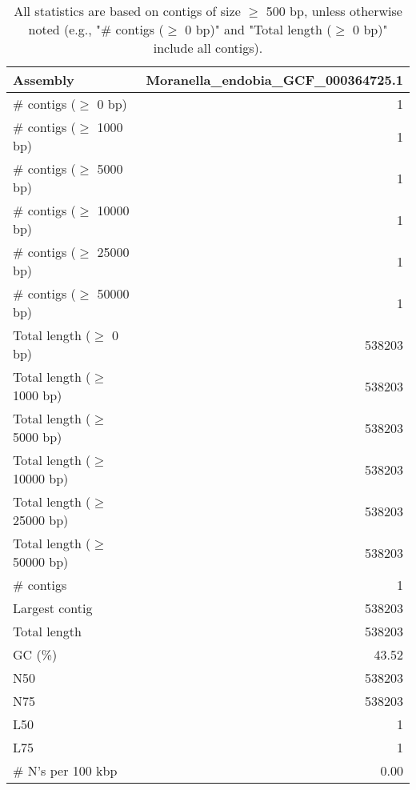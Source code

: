 \documentclass[12pt,a4paper]{article}
\begin{document}
\begin{table}[ht]
\begin{center}
\caption{All statistics are based on contigs of size $\geq$ 500 bp, unless otherwise noted (e.g., "\# contigs ($\geq$ 0 bp)" and "Total length ($\geq$ 0 bp)" include all contigs).}
\begin{tabular}{|l*{1}{|r}|}
\hline
Assembly & Moranella\_endobia\_GCF\_000364725.1 \\ \hline
\# contigs ($\geq$ 0 bp) & 1 \\ \hline
\# contigs ($\geq$ 1000 bp) & 1 \\ \hline
\# contigs ($\geq$ 5000 bp) & 1 \\ \hline
\# contigs ($\geq$ 10000 bp) & 1 \\ \hline
\# contigs ($\geq$ 25000 bp) & 1 \\ \hline
\# contigs ($\geq$ 50000 bp) & 1 \\ \hline
Total length ($\geq$ 0 bp) & 538203 \\ \hline
Total length ($\geq$ 1000 bp) & 538203 \\ \hline
Total length ($\geq$ 5000 bp) & 538203 \\ \hline
Total length ($\geq$ 10000 bp) & 538203 \\ \hline
Total length ($\geq$ 25000 bp) & 538203 \\ \hline
Total length ($\geq$ 50000 bp) & 538203 \\ \hline
\# contigs & 1 \\ \hline
Largest contig & 538203 \\ \hline
Total length & 538203 \\ \hline
GC (\%) & 43.52 \\ \hline
N50 & 538203 \\ \hline
N75 & 538203 \\ \hline
L50 & 1 \\ \hline
L75 & 1 \\ \hline
\# N's per 100 kbp & 0.00 \\ \hline
\end{tabular}
\end{center}
\end{table}
\end{document}

